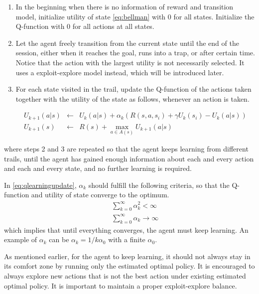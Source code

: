 \begin{enumerate}
	\item In the beginning when there is no information of reward and transition model, initialize utility of state \eqref{eq:bellman} with $0$ for all states. Initialize the Q-function with $0$ for all actions at all states.
	\item Let the agent freely transition from the current state until the end of the session, either when it reaches the goal, runs into a trap, or after certain time. Notice that the action with the largest utility is not necessarily selected. It uses a exploit-explore model instead, which will be introduced later.
	\item For each state visited in the trail, update the Q-function of the actions taken together with the utility of the state as follows, whenever an action is taken.

	\begin{eqnarray}
		U_{k+1}(a|s) &\leftarrow& U_k(a|s) + \alpha_k\left(R(s,a,s_i) + \gamma U_k(s_i) - U_k(a|s)\right) \label{eq:qlearningupdate} \\
		U_{k+1}(s) &\leftarrow& R(s) + \max_{a\in A(s)} U_{k+1}(a|s) \nonumber
	\end{eqnarray}

\end{enumerate}
where steps 2 and 3 are repeated so that the agent keeps learning from different trails, until the agent has gained enough information about each and every action and each and every state, and no further learning is required.

In \eqref{eq:qlearningupdate}, $\alpha_k$ should fulfill the following criteria, so that the Q-function and utility of state converge to the optimum.
\begin{eqnarray}
	&& \sum_{k=0}^{\infty} \alpha_k^2 < \infty \nonumber \\
	&& \sum_{k=0}^{\infty} \alpha_k \rightarrow \infty \nonumber
\end{eqnarray}
which implies that until everything converges, the agent must keep learning. An example of $\alpha_k$ can be $\alpha_k = 1/k \alpha_0$ with a finite $\alpha_0$.

As mentioned earlier, for the agent to keep learning, it should not always stay in its comfort zone by running only the estimated optimal policy. It is encouraged to always explore new actions that is not the best action under existing estimated optimal policy. It is important to maintain a proper exploit-explore balance.

